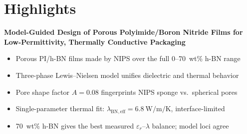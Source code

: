 \documentclass[10pt,a4paper]{article}
\newcommand{\eps}{\ensuremath{\varepsilon_r}}   %
\newcommand{\lam}{\ensuremath{\lambda}}
\newcommand{\lamBN}{\ensuremath{\lambda_{\mathrm{BN,eff}}}}
\begin{document}
\section*{Highlights}
\noindent\textbf{Model-Guided Design of Porous Polyimide/Boron Nitride Films for Low-Permittivity, Thermally Conductive Packaging}
\begin{itemize}
\item Porous PI/h-BN films made by NIPS over the full 0--70~wt\% h-BN range
\item Three-phase Lewis--Nielsen model unifies dielectric and thermal behavior
\item Pore shape factor $A=0.08$ fingerprints NIPS sponge vs.\ spherical pores
\item Single-parameter thermal fit: $\lamBN = \SI{6.8}{\watt\per\meter\per\kelvin}$, interface-limited
\item 70~wt\% h-BN gives the best measured \eps--\lam{} balance; model loci agree
\end{itemize}
\end{document}
